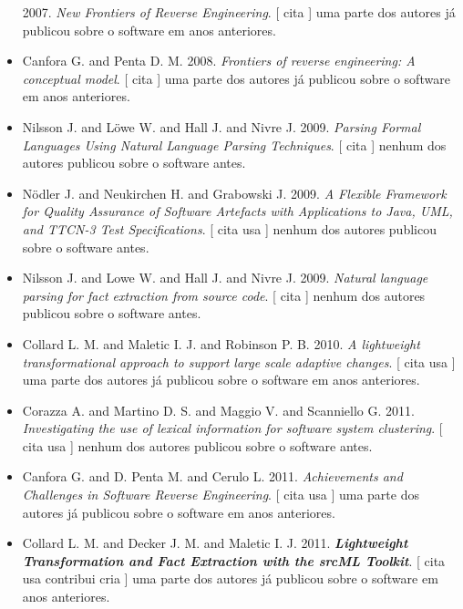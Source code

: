 \begin{itemize}
      2007.
        \textit{ New Frontiers of Reverse Engineering}.
      [
          cita
      ]
uma parte dos autores já publicou sobre o software em anos anteriores.
\item Canfora G. and Penta D. M.
      2008.
        \textit{ Frontiers of reverse engineering: A conceptual model}.
      [
          cita
      ]
uma parte dos autores já publicou sobre o software em anos anteriores.
\item Nilsson J. and L\"{o}we W. and Hall J. and Nivre J.
      2009.
        \textit{ Parsing Formal Languages Using Natural Language Parsing Techniques}.
      [
          cita
      ]
nenhum dos autores publicou sobre o software antes.
\item Nödler J. and Neukirchen H. and Grabowski J.
      2009.
        \textit{ A Flexible Framework for Quality Assurance of Software Artefacts with Applications to Java, UML, and TTCN-3 Test Specifications}.
      [
          cita
          usa
      ]
nenhum dos autores publicou sobre o software antes.
\item Nilsson J. and Lowe W. and Hall J. and Nivre J.
      2009.
        \textit{ Natural language parsing for fact extraction from source code}.
      [
          cita
      ]
nenhum dos autores publicou sobre o software antes.
\item Collard L. M. and Maletic I. J. and Robinson P. B.
      2010.
        \textit{ A lightweight transformational approach to support large scale adaptive changes}.
      [
          cita
          usa
      ]
uma parte dos autores já publicou sobre o software em anos anteriores.
\item Corazza A. and Martino D. S. and Maggio V. and Scanniello G.
      2011.
        \textit{ Investigating the use of lexical information for software system clustering}.
      [
          cita
          usa
      ]
nenhum dos autores publicou sobre o software antes.
\item Canfora G. and D. Penta M. and Cerulo L.
      2011.
        \textit{ Achievements and Challenges in Software Reverse Engineering}.
      [
          cita
          usa
      ]
uma parte dos autores já publicou sobre o software em anos anteriores.
\item Collard L. M. and Decker J. M. and Maletic I. J.
      2011.
        \textbf{\textit{ Lightweight Transformation and Fact Extraction with the srcML Toolkit}}.
      [
          cita
          usa
          contribui
          cria
      ]
uma parte dos autores já publicou sobre o software em anos anteriores.

\end{itemize}
